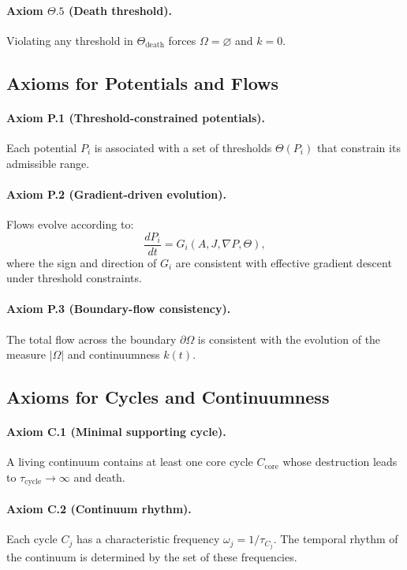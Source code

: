 \paragraph{Axiom \texorpdfstring{\(\Theta.5\)}{\Theta.5} (Death threshold).}
Violating any threshold in \(\Theta_{\mathrm{death}}\) forces \(\Omega=\varnothing\) and \(k=0\).

\subsection{Axioms for Potentials and Flows}

\paragraph{Axiom P.1 (Threshold-constrained potentials).}
Each potential \(P_i\) is associated with a set of thresholds \(\Theta(P_i)\) that constrain its admissible range.

\paragraph{Axiom P.2 (Gradient-driven evolution).}
Flows evolve according to:
\[
  \frac{dP_i}{dt} = G_i(A,J,\nabla P,\Theta),
\]
where the sign and direction of \(G_i\) are consistent with effective gradient descent under threshold constraints.

\paragraph{Axiom P.3 (Boundary-flow consistency).}
The total flow across the boundary \(\partial\Omega\) is consistent with the evolution of the measure \(|\Omega|\) and continuumness \(k(t)\).

\subsection{Axioms for Cycles and Continuumness}

\paragraph{Axiom C.1 (Minimal supporting cycle).}
A living continuum contains at least one core cycle \(C_{\mathrm{core}}\) whose destruction leads to \(\tau_{\mathrm{cycle}}\to\infty\) and death.

\paragraph{Axiom C.2 (Continuum rhythm).}
Each cycle \(C_j\) has a characteristic frequency \(\omega_j=1/\tau_{C_j}\).
The temporal rhythm of the continuum is determined by the set of these frequencies.

